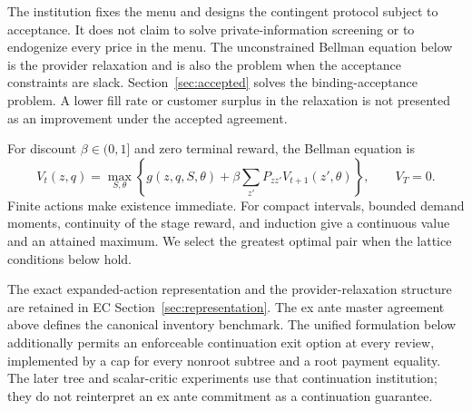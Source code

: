 \documentclass[11pt,letterpaper]{article}
\theoremstyle{definition}
\newcommand{\1}{\mathbf 1}
\begin{document}
The institution fixes the menu and designs the contingent protocol subject to acceptance. It does not claim to solve private-information screening or to endogenize every price in the menu. The unconstrained Bellman equation below is the provider relaxation and is also the problem when the acceptance constraints are slack. Section~\ref{sec:accepted} solves the binding-acceptance problem. A lower fill rate or customer surplus in the relaxation is not presented as an improvement under the accepted agreement.

For discount $\beta\in(0,1]$ and zero terminal reward, the Bellman equation is
\begin{equation}\label{eq:bellman}
 V_t(z,q)=\max_{S,\theta}\left\{g(z,q,S,\theta)
       +\beta\sum_{z'}P_{zz'}V_{t+1}(z',\theta)\right\},\qquad V_T=0.
\end{equation}
Finite actions make existence immediate. For compact intervals, bounded demand moments, continuity of the stage reward, and induction give a continuous value and an attained maximum. We select the greatest optimal pair when the lattice conditions below hold.


The exact expanded-action representation and the provider-relaxation structure are retained in EC Section~\ref{sec:representation}. The ex ante master agreement above defines the canonical inventory benchmark. The unified formulation below additionally permits an enforceable continuation exit option at every review, implemented by a cap for every nonroot subtree and a root payment equality. The later tree and scalar-critic experiments use that continuation institution; they do not reinterpret an ex ante commitment as a continuation guarantee.



\end{document}
